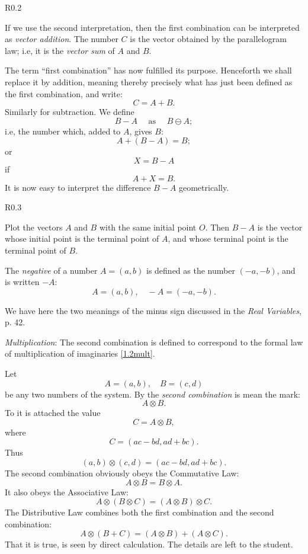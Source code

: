 \begin{wrapfigure}{R}{0.2\textwidth}
	\centering
{}
\end{wrapfigure} 


If we use the second interpretation, then the first combination can be interpreted as \emph{vector addition}. The number $C$ is the vector obtained by the parallelogram law; i.e, it is the \emph{vector sum} of $A$ and $B$. 

The term ``first combination'' has now fulfilled its purpose. Henceforth we shall replace it by addition, meaning thereby precisely what has just been defined as the first combination, and write:
\[
C=A+B
.\] Similarly for subtraction. We define
\[
B-A \quad \text{ as } \quad B \ominus A;
\] i.e, the number which, added to $A$, gives $B$:
\[
	A+(B-A)=B
;\] or
\[
X=B-A
\]if
\[
A+X=B
.\] It is now easy to interpret the difference $B-A$ geometrically. 
\begin{wrapfigure}{R}{0.3\textwidth}
	\centering
{}
\end{wrapfigure} 

Plot the vectors $A$ and $B$ with the same initial point $O$. Then $B-A$ is the vector whose initial point is the terminal point of $A$, and whose terminal point is the terminal point of $B$. 

The \emph{negative} of a number $A=(a,b)$ is defined as the number $(-a,-b)$, and is written $-A$:
\[
	A=(a,b), \quad -A=(-a,-b)
.\] 

We have here the two meanings of the minus sign discussed in the \emph{Real Variables}, p. 42.

\emph{Multiplication}: The second combination is defined to correspond to the formal law of multiplication of imaginaries \ref{1.2mult}.

Let
\[
	A=(a,b), \quad B=(c,d)
\] be any two numbers of the system. By the \emph{second combination} is mean the mark:
\[
A\otimes B
.\] To it is attached the value
\[
C=A \otimes B
,\] where
\[
	C=(ac-bd,ad+bc)
.\] Thus
\[
	(a,b) \otimes (c,d) = (ac-bd,ad+bc)
.\] The second combination obviously obeys the Commutative Law:
\[
A\otimes B = B \otimes A
.\] It also obeys the Associative Law:
\[
	A\otimes (B \otimes C)=(A\otimes B)\otimes C
.\] The Distributive Law combines both the first combination and the second combination:
\[
	A\otimes (B+C)=(A\otimes B)+(A\otimes C)
.\] That it is true, is seen by direct calculation. The details are left to the student.

